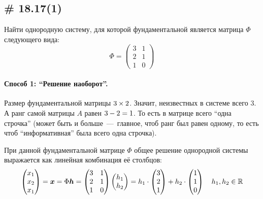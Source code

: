 \documentclass[a4paper,12pt]{article}
\begin{document}
  
  \subsection{\# 18.17(1)}
  
  Найти однородную систему, для которой фундаментальной является матрица $\Phi$ следующего вида:
  \[
    \Phi = \begin{pmatrix}
      3 & 1\\
      2 & 1\\
      1 & 0
    \end{pmatrix}
  \]
  
  \begin{solution}
    \hphantom{X}\par  %
    
    \paragraph{Способ 1: ``Решение наоборот''.}
    
    Размер фундаментальной матрицы $3 \hm\times 2$.
    Значит, неизвестных в системе всего $3$.
    А ранг самой матрицы $A$ равен $3 \hm- 2 \hm= 1$.
    То есть в матрице всего ``одна строчка'' (может быть и больше~---~главное, чтоб ранг был равен одному, то есть чтоб ``информативная'' была всего одна строчка).
    
    При данной фундаментальной матрице $\Phi$ общее решение однородной системы выражается как линейная комбинация её столбцов:
    \begin{equation*}
    \begin{split}
      \begin{pmatrix} x_1 \\ x_2 \\ x_1 \end{pmatrix}
      = \boldsymbol x = \Phi \boldsymbol h = \begin{pmatrix}
          3 & 1\\
          2 & 1\\
          1 & 0
        \end{pmatrix} \begin{pmatrix}
          h_1 \\ h_2
        \end{pmatrix}
      = h_1 \cdot \begin{pmatrix} 3 \\ 2 \\ 1 \end{pmatrix} +
         h_2 \cdot \begin{pmatrix} 1 \\ 1 \\ 0 \end{pmatrix} \quad h_1, h_2 \in \operatorname{\mathbb R}
    \end{split}
    \end{equation*}
    

\end{solution}
\end{document}
